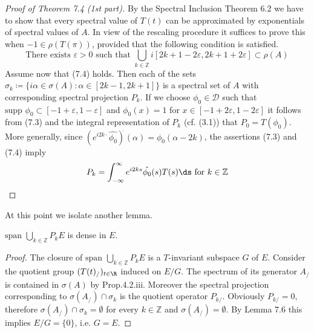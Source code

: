 \begin{proof}[Proof of Theorem 7.4 (1st part)]
By the Spectral Inclusion Theorem 6.2 we have to show that every spectral value of $T(t)$ can be approximated by exponentials of spectral values of $A$.
In view of the rescaling procedure it suffices to prove this when $-1 \in \rho(T(\pi))$, provided that the following condition is satisfied.
\begin{equation}\label{eq:a3-7.4}
\text{There exists } \varepsilon > 0 \text{ such that } \bigcup_{k\in\mathbb{Z}} i[2k+1-2\varepsilon,2k+1+2\varepsilon] \subset \rho(A)
\end{equation}
Assume now that (7.4) holds.
Then each of the sets $\sigma_{k}\coloneqq \{i\alpha \in \sigma(A) \colon \alpha \in [2k-1,2k+1]\}$ is a spectral set of $A$ with corresponding spectral projection $P_{k}$.
If we choose $\phi_{0} \in \mathcal{D}$ such that $\text{supp }\phi_{0} \subset [-1+\varepsilon,1-\varepsilon]$ and $\phi_{0}(x) = 1$ for $x \in [-1+2\varepsilon,1-2\varepsilon]$ it follows from (7.3) and the integral representation of $P_{k}$ (cf. (3.1)) that $P_{0} = T(\phi_{0})$.
More generally, since $(e^{i2k\cdot}\hat{\phi_{0}})^{\check{}}(\alpha) = \phi_{0}(\alpha-2k)$, the assertions (7.3) and (7.4) imply
\begin{equation}\label{eq:a3-7.5}
P_{k} = \int_{-\infty}^{\infty} e^{i2ks}\hat{\phi_{0}}(s)T(s)\ds \text{ for } k \in \mathbb{Z}
\end{equation}
\end{proof}

At this point we isolate another lemma.
\begin{lemma}\label{lem:a3-7.7}
$\text{span }\bigcup_{k\in\mathbb{Z}} P_{k}E$ is dense in $E$.
\end{lemma}
\begin{proof}
The closure of $\text{span }\bigcup_{k\in\mathbb{Z}} P_{k}E$ is a $T$-invariant subspace $G$ of $E$.
Consider the quotient group $(T(t)_/)_{t\in\R}$ induced on $E/G$.
The spectrum of its generator $A_{/}$ is contained in $\sigma(A)$ by Prop.4.2.iii.
Moreover the spectral projection corresponding to $\sigma(A_{/}) \cap \sigma_{k}$ is the quotient operator $P_{k/}$.
Obviously $P_{k/} = 0$, therefore $\sigma(A_{/}) \cap \sigma_{k} = \emptyset$ for every $k \in \mathbb{Z}$ and $\sigma(A_{/}) = \emptyset$.
By Lemma 7.6 this implies $E/G = \{0\}$, i.e. $G = E$.
\end{proof}


